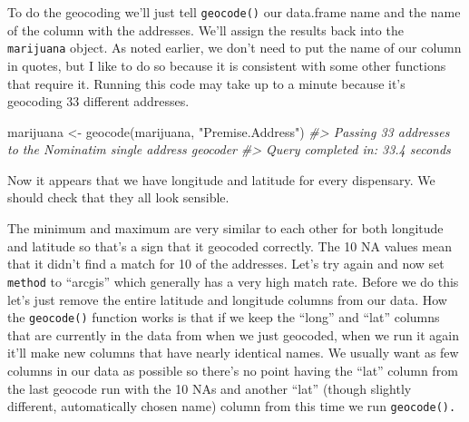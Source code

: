 \documentclass[
]{krantz}
\makeatletter
\newenvironment{Shaded}{\begin{snugshade}}{\end{snugshade}}
\newcommand{\CommentTok}[1]{\textcolor[rgb]{0.37,0.37,0.37}{\textit{#1}}}
\newcommand{\FunctionTok}[1]{\textcolor[rgb]{0,0,0}{#1}}
\newcommand{\NormalTok}[1]{#1}
\newcommand{\OtherTok}[1]{\textcolor[rgb]{0.37,0.37,0.37}{#1}}
\newcommand{\SpecialCharTok}[1]{\textcolor[rgb]{0,0,0}{#1}}
\newcommand{\StringTok}[1]{\textcolor[rgb]{0.5,0.5,0.5}{#1}}
\newenvironment{kframe}{%
\medskip{}
\setlength{\fboxsep}{.8em}
 \def\at@end@of@kframe{}%
 \ifinner\ifhmode%
  \def\at@end@of@kframe{\end{minipage}}%
  \begin{minipage}{\columnwidth}%
 \fi\fi%
 \def\FrameCommand##1{\hskip\@totalleftmargin \hskip-\fboxsep
 \colorbox{shadecolor}{##1}\hskip-\fboxsep
     \hskip-\linewidth \hskip-\@totalleftmargin \hskip\columnwidth}%
 \MakeFramed {\advance\hsize-\width
   \@totalleftmargin\z@ \linewidth\hsize
   \@setminipage}}%
 {\par\unskip\endMakeFramed%
 \at@end@of@kframe}
\renewenvironment{Shaded}{\begin{kframe}}{\end{kframe}}
\makeatother
\begin{document}
To do the geocoding we'll just tell \texttt{geocode()} our
data.frame name and the name of the column with the
addresses. We'll assign the results back into the
\texttt{marijuana} object. As noted earlier, we don't need
to put the name of our column in quotes, but I like to do so
because it is consistent with some other functions that
require it. Running this code may take up to a minute
because it's geocoding 33 different addresses.

\begin{Shaded}
\begin{Highlighting}[]
\NormalTok{marijuana }\OtherTok{\textless{}{-}} \FunctionTok{geocode}\NormalTok{(marijuana, }\StringTok{"Premise.Address"}\NormalTok{)}
\CommentTok{\#\textgreater{} Passing 33 addresses to the Nominatim single address geocoder}
\CommentTok{\#\textgreater{} Query completed in: 33.4 seconds}
\end{Highlighting}
\end{Shaded}

Now it appears that we have longitude and latitude for every
dispensary. We should check that they all look sensible.

\begin{Shaded}
\end{Shaded}

\begin{Shaded}
\end{Shaded}

The minimum and maximum are very similar to each other for
both longitude and latitude so that's a sign that it
geocoded correctly. The 10 NA values mean that it didn't
find a match for 10 of the addresses. Let's try again and
now set \texttt{method} to ``arcgis'' which generally has a
very high match rate. Before we do this let's just remove
the entire latitude and longitude columns from our data. How
the \texttt{geocode()} function works is that if we keep the
``long'' and ``lat'' columns that are currently in the data
from when we just geocoded, when we run it again it'll make
new columns that have nearly identical names. We usually
want as few columns in our data as possible so there's no
point having the ``lat'' column from the last geocode run
with the 10 NAs and another ``lat'' (though slightly
different, automatically chosen name) column from this time
we run \texttt{geocode().}
\end{document}
